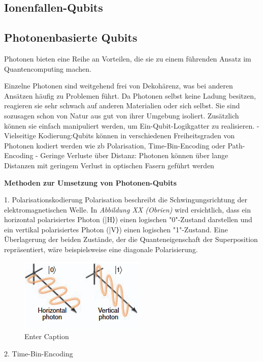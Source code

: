 \subsection{Ionenfallen-Qubits }
\subsection{Photonenbasierte Qubits}

Photonen bieten eine Reihe an Vorteilen, die sie zu einem führenden Ansatz im Quantencomputing machen. 

Einzelne Photonen sind weitgehend frei von Dekohärenz, was bei anderen Ansätzen häufig zu Problemen führt. Da Photonen selbst keine Ladung besitzen, reagieren sie sehr schwach auf anderen Materialien oder sich selbst. Sie sind sozusagen schon von Natur aus gut von ihrer Umgebung isoliert. 
Zusätzlich können sie einfach manipuliert werden, um Ein-Qubit-Logikgatter zu realisieren. 
- Vielseitige Kodierung:Qubits können in verschiedenen Freiheitsgraden von Photonen kodiert werden wie zb Polarisation, Time-Bin-Encoding oder Path-Encoding
- Geringe Verluste über Distanz: Photonen können über lange Distanzen mit geringem Verlust in optischen Fasern geführt werden 

\textbf{Methoden zur Umsetzung von Photonen-Qubits}

1. Polarisationskodierung
Polarisation beschreibt die Schwingungsrichtung der elektromagnetischen Welle. In\textit{ Abbildung XX (Obrien)} wird ersichtlich, dass ein horizontal polarisiertes Photon (|H⟩) einen logischen "0"-Zustand darstellen und ein vertikal polarisiertes Photon (|V⟩) einen logischen "1"-Zustand. Eine Überlagerung der beiden Zustände, der die Quanteneigenschaft der Superposition repräsentiert, wäre beispielsweise eine diagonale Polarisierung. 
\begin{figure}
    \centering
    \includegraphics[width=0.5\linewidth]{Photonen_Polarisierung.png}
    \caption{Enter Caption}
    \label{fig:enter-label}
\end{figure}
\cite{obrien_optical_2007}

2. Time-Bin-Encoding 


